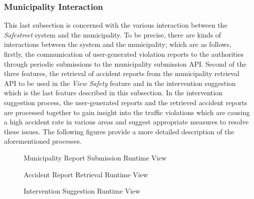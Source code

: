 
\subsubsection{Municipality Interaction}
This last subsection is concerned with the various interaction between the \emph{Safestreet} system and the municipality. To be precise, there are kinds of interactions between the system and the municipality; which are as follows, firstly, the communication of user-generated violation reports to the authorities through periodic submissions to the municipality submission API. Second of the three features, the retrieval of accident reports from the municipality retrieval API to be used in the \emph{View Safety} feature and in the intervention suggestion which is the last feature described in this subsection. In the intervention suggestion process, the user-generated reports and the retrieved accident reports are processed together to gain insight into the traffic violations which are causing a high accident rate in various areas and suggest appropriate measures to resolve these issues. The following figures provide a more detailed description of the aforementioned processes.

\begin{figure}[H]
\caption{Municipality Report Submission Runtime View}
\label{fig:RuntimeSub}
\centering

\end{figure}

\begin{figure}[H]
\caption{Accident Report Retrieval Runtime View}
\label{fig:RuntimeRet}
\centering

\end{figure}

\begin{figure}[H]
\caption{Intervention Suggestion Runtime View}
\label{fig:RuntimeInter}
\centering

\end{figure}

